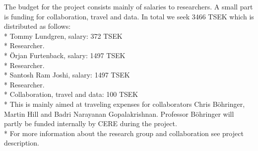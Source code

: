 \documentclass[11pt,a4paper]{extarticle}
\begin{document}
The budget for the project consists mainly of salaries to researchers. A small part is funding
for collaboration, travel and data. In total we seek 3466 TSEK which is distributed as follows:\\*
Tommy Lundgren, salary: 372 TSEK\\*
Researcher.\\*
Örjan Furtenback, salary: 1497 TSEK\\*
Researcher.\\*
Santosh Ram Joshi, salary: 1497 TSEK\\*
Researcher.\\*
Collaboration, travel and data: 100 TSEK\\*
This is mainly aimed at traveling expenses for collaborators Chris Böhringer, Martin Hill and Badri Narayanan Gopalakrishnan. Professor Böhringer will partly be funded internally by CERE during the project.\\*
For more information about the research group and collaboration see project description.
\end{document}
